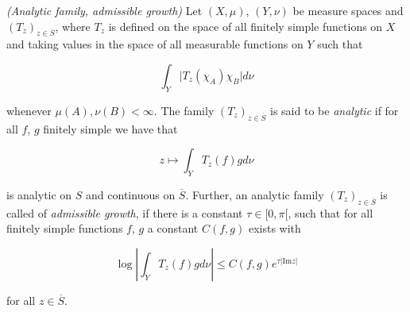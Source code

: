 \begin{mdframed}
	\begin{definition}\emph{(Analytic family, admissible growth)}
		Let $(X,\mu)$, $(Y,\nu)$ be measure spaces and $\left( T_z \right)_{z \in \overline{S}}$, where $T_z$ is defined on the space of all finitely simple functions on $X$ and taking values in the space of all measurable functions on $Y$ such that

		\begin{equation}
			\int_Y \vert T_z(\chi_A)\chi_B \vert d\nu
		\end{equation}

		whenever $\mu(A),\nu(B) < \infty$. The family $\left( T_z \right)_{z \in \overline{S}}$ is said to be \emph{analytic} if for all $f$, $g$ finitely simple we have that

		\begin{equation}
			z \mapsto \int_Y T_z(f)gd\nu
		\end{equation}

		is analytic on $S$ and continuous on $\overline{S}$. Further, an analytic family $\left( T_z \right)_{z \in \overline{S}}$ is called of \emph{admissible growth}, if there is a constant $\tau \in [0,\pi[$, such that for all finitely simple functions $f$, $g$ a constant $C(f,g)$ exists with

			\begin{equation}
				\log\left\vert \int_Y T_z(f) g d\nu\right\vert \leqslant C(f,g)e^{\tau\vert \mathrm{Im}z\vert}
			\end{equation}

			for all $z \in \overline{S}$.
	\end{definition}
\end{mdframed}

\vspace{2mm}

